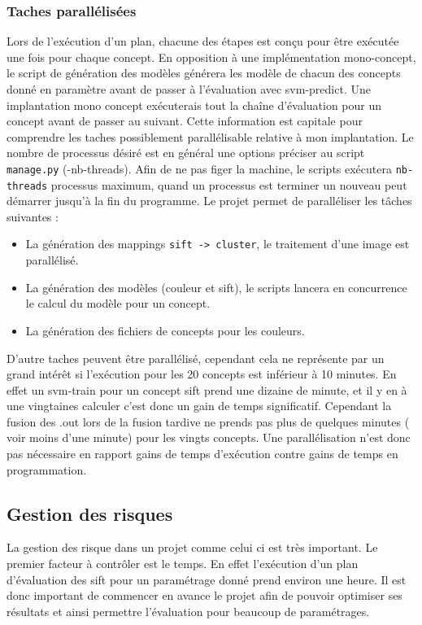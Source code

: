 \documentclass[a4paper, 11pt]{article}
\begin{document}
\subsubsection{Taches parallélisées}
Lors de l'exécution d'un plan, chacune des étapes est conçu pour être exécutée une fois pour chaque concept. En opposition à une implémentation mono-concept, le script de génération des modèles générera les modèle de chacun des concepts donné en paramètre avant de passer à l'évaluation avec svm-predict. Une implantation mono concept exécuterais tout la chaîne d'évaluation pour un concept avant de passer au suivant. Cette information est capitale pour comprendre les taches possiblement parallélisable relative à mon implantation. Le nombre de processus désiré est en général une options préciser au script \texttt{manage.py} (-nb-threads). Afin de ne pas figer la machine, le scripts exécutera \texttt{nb-threads} processus maximum, quand un processus est terminer un nouveau peut démarrer jusqu'à la fin du programme.
Le projet permet de paralléliser les tâches suivantes :
\begin{itemize}
	\item La génération des mappings \texttt{sift -> cluster}, le traitement d'une image est parallélisé.
	\item La génération des modèles (couleur et sift), le scripts lancera en concurrence le calcul du modèle pour un concept.
	\item La génération des fichiers de concepts pour les couleurs.
\end{itemize}

D'autre taches peuvent être parallélisé, cependant cela ne représente par un grand intérêt si l'exécution pour les 20 concepts est inférieur à 10 minutes. En effet un svm-train pour un concept sift prend une dizaine de minute, et il y en à une vingtaines calculer c'est donc un gain de temps significatif. Cependant la fusion des .out lors de la fusion tardive ne prends pas plus de quelques minutes ( voir moins d'une minute) pour les vingts concepts. Une parallélisation n'est donc pas nécessaire en rapport gains de temps d'exécution contre gains de temps en programmation.

\subsection{Gestion des risques}
La gestion des risque dans un projet comme celui ci est très important. Le premier facteur à contrôler est le temps. En effet l'exécution d'un plan d'évaluation des sift pour un paramétrage donné prend environ une heure. Il est donc important de commencer en avance le projet afin de pouvoir optimiser ses résultats et ainsi permettre l'évaluation pour beaucoup de paramétrages.
\end{document}
